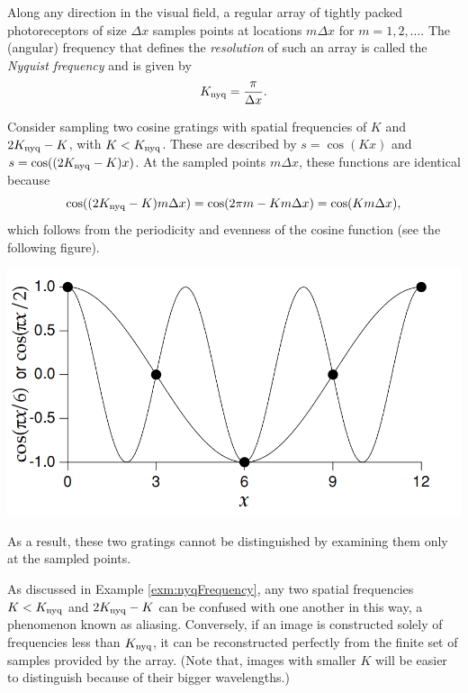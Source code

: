 \begin{defn}
  Along any direction in the visual field, a regular array of tightly packed photoreceptors of size $\Delta x$ samples points at locations $m\Delta x$ for $m = 1,2,\dots$. The (angular) frequency that defines the \emph{resolution} of such an array is called the \emph{Nyquist frequency} and is given by
  \begin{equation}
    \label{equ:2.20}
    K_{\rm{nyq}} = \frac{\pi}{\Delta x}.
  \end{equation}
\end{defn}

\begin{exm}
  \label{exm:nyqFrequency}
  Consider sampling two cosine gratings with spatial frequencies of $K$ and $2K_{\rm{nyq}}-K$, with $K < K_{\rm{nyq}}$. These are described by $s = \cos(Kx)$ and $s = \cos((2K_{\rm{nyq}}-K)x)$. At the sampled points $m\Delta x$, these functions are identical because
  \begin{displaymath}
    \cos((2K_{\rm{nyq}}-K)m\Delta x) = \cos(2\pi m - Km\Delta x) = \cos(Km\Delta x),
  \end{displaymath}
  which follows from the periodicity and evenness of the cosine function (see the following figure).
  \begin{center}
    \includegraphics[scale=0.2]{./png/NyqFrequency}
  \end{center}
  As a result, these two gratings cannot be distinguished by examining them only at the sampled points.
\end{exm}

\begin{rem}
  As discussed in Example \ref{exm:nyqFrequency}, any two spatial frequencies $K < K_{\rm{nyq}}$ and $2K_{\rm{nyq}}-K$ can be confused with one another in this way, a phenomenon known as aliasing. Conversely, if an image is constructed solely of frequencies less than $K_{\rm{nyq}}$, it can be reconstructed perfectly from the finite set of samples provided by the array. (Note that, images with smaller $K$ will be easier to distinguish because of their bigger wavelengths.)
\end{rem}


